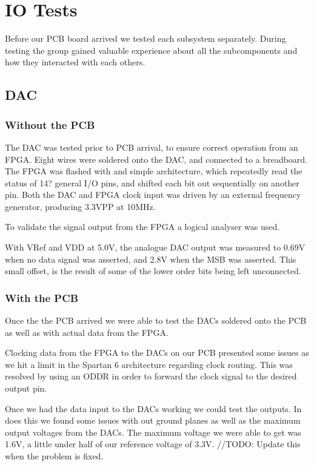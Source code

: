 \section{IO Tests}
Before our PCB board arrived we tested each subsystem separately.
During testing the group gained valuable experience about all the subcomponents and how they interacted with each others.

\subsection{DAC}

\subsubsection{Without the PCB}

The DAC was tested prior to PCB arrival, to ensure correct operation from an FPGA.
Eight wires were soldered onto the DAC, and connected to a breadboard.
The FPGA was flashed with and simple architecture, which repeatedly read the status of 14? general I/O pins, and shifted each bit out sequentially on another pin.
Both the DAC and FPGA clock input was driven by an external frequency generator, producing 3.3VPP at 10MHz.

To validate the signal output from the FPGA a logical analyser was used.

With VRef and VDD at 5.0V, the analogue DAC output was measured to 0.69V when no data signal was asserted, and 2.8V when the MSB was asserted. This small offset, is the result of some of the lower order bits being left unconnected.

\subsubsection{With the PCB}

Once the the PCB arrived we were able to test the DACs soldered onto the PCB as well as with actual data from the FPGA.

Clocking data from the FPGA to the DACs on our PCB presented some issues as we hit a limit in the Spartan 6 architecture regarding clock routing. This was resolved by using an ODDR\cite[pp. 61--65]{fpga-io} in order to forward the clock signal to the desired output pin.

Once we had the data input to the DACs working we could test the outputs. In does this we found some issues with out ground planes as well as the maximum output voltages from the DACs. The maximum voltage we were able to get was 1.6V, a little under half of our reference voltage of 3.3V. //TODO: Update this when the problem is fixed.


